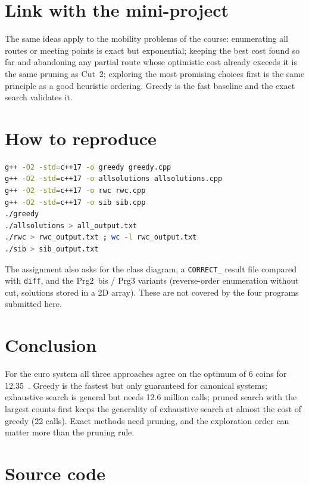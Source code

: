\documentclass[11pt,a4paper]{article}
\begin{document}
\section{Link with the mini-project}
The same ideas apply to the mobility problems of the course: enumerating all routes or meeting points is exact but exponential; keeping the best cost found so far and abandoning any partial route whose optimistic cost already exceeds it is the same pruning as Cut~2; exploring the most promising choices first is the same principle as a good heuristic ordering. Greedy is the fast baseline and the exact search validates it.

\section{How to reproduce}
\begin{lstlisting}[language=bash,numbers=none]
g++ -O2 -std=c++17 -o greedy greedy.cpp
g++ -O2 -std=c++17 -o allsolutions allsolutions.cpp
g++ -O2 -std=c++17 -o rwc rwc.cpp
g++ -O2 -std=c++17 -o sib sib.cpp
./greedy
./allsolutions > all_output.txt
./rwc > rwc_output.txt ; wc -l rwc_output.txt
./sib > sib_output.txt
\end{lstlisting}
The assignment also asks for the class diagram, a \texttt{CORRECT\_} result file compared with \texttt{diff}, and the Prg2~bis / Prg3 variants (reverse-order enumeration without cut, solutions stored in a 2D array). These are not covered by the four programs submitted here. %

\section{Conclusion}
For the euro system all three approaches agree on the optimum of 6 coins for 12.35~\texteuro. Greedy is the fastest but only guaranteed for canonical systems; exhaustive search is general but needs 12.6 million calls; pruned search with the largest counts first keeps the generality of exhaustive search at almost the cost of greedy (22 calls). Exact methods need pruning, and the exploration order can matter more than the pruning rule.

\appendix
\section{Source code}
\end{document}
